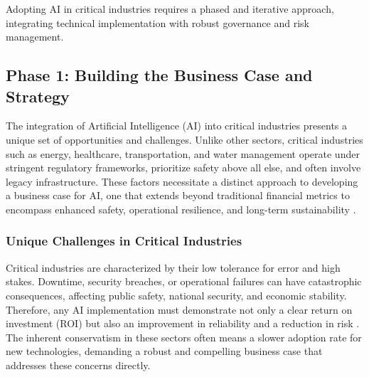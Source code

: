Adopting AI in critical industries requires a phased and iterative approach, integrating technical implementation with robust governance and risk management.



\subsection{Phase 1: Building the Business Case and Strategy}

The integration of Artificial Intelligence (AI) into critical industries presents a unique set of opportunities and challenges. Unlike other sectors, critical industries such as energy, healthcare, transportation, and water management operate under stringent regulatory frameworks, prioritize safety above all else, and often involve legacy infrastructure. These factors necessitate a distinct approach to developing a business case for AI, one that extends beyond traditional financial metrics to encompass enhanced safety, operational resilience, and long-term sustainability \parencite{Smith2017}.

\subsubsection{Unique Challenges in Critical Industries}
Critical industries are characterized by their low tolerance for error and high stakes. Downtime, security breaches, or operational failures can have catastrophic consequences, affecting public safety, national security, and economic stability. Therefore, any AI implementation must demonstrate not only a clear return on investment (ROI) but also an improvement in reliability and a reduction in risk \parencite{Johnson2018}. The inherent conservatism in these sectors often means a slower adoption rate for new technologies, demanding a robust and compelling business case that addresses these concerns directly.

